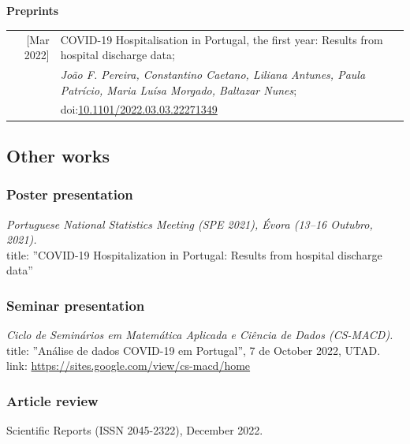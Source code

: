 \documentclass[11pt,oneside,a4paper,titlepage]{article}
\begin{document}
\\
\\
\textcolor{textGrey}{\textbf{Preprints}}
\\
\begin{tabular}{N P}
[Mar 2022] & COVID-19 Hospitalisation in Portugal, the first year: Results from hospital discharge data;\\
& \textit{João F. Pereira, Constantino Caetano, Liliana Antunes, Paula Patrício, Maria Luísa Morgado, Baltazar Nunes};\\
& doi:\href{https://doi.org/10.1101/2022.03.03.22271349}{10.1101/2022.03.03.22271349}\\
\end{tabular}

%
\subsection{  Other works}

\vspace{-2mm}
\subsubsection{Poster presentation}
\textit{Portuguese National Statistics Meeting (SPE 2021), Évora (13–16 Outubro, 2021).}\\
title: ''COVID-19 Hospitalization in Portugal: Results from hospital discharge data''\\

\vspace{-2mm}
\subsubsection{Seminar presentation}
\textit{Ciclo de Seminários em Matemática Aplicada e Ciência de Dados (CS-MACD).}\\
title: ''Análise de dados COVID-19 em Portugal'', 7 de October 2022, UTAD.\\
link: \href{https://sites.google.com/view/cs-macd/home}{https://sites.google.com/view/cs-macd/home}\\

\vspace{-2mm}
\subsubsection{Article review}
Scientific Reports (ISSN 2045-2322), December 2022.
\end{document}
